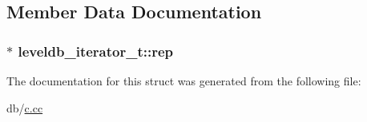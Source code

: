 \subsection{Member Data Documentation}
\hypertarget{structleveldb__iterator__t_a051a1df01c49d34f34628ae1467f9377}{}
\subsubsection[{rep}]{$\ast$ leveldb\+\_\+iterator\+\_\+t\+::rep}\label{structleveldb__iterator__t_a051a1df01c49d34f34628ae1467f9377}


The documentation for this struct was generated from the following file\+:\begin{DoxyCompactItemize}
\item 
db/\hyperlink{c_8cc}{c.\+cc}\end{DoxyCompactItemize}
